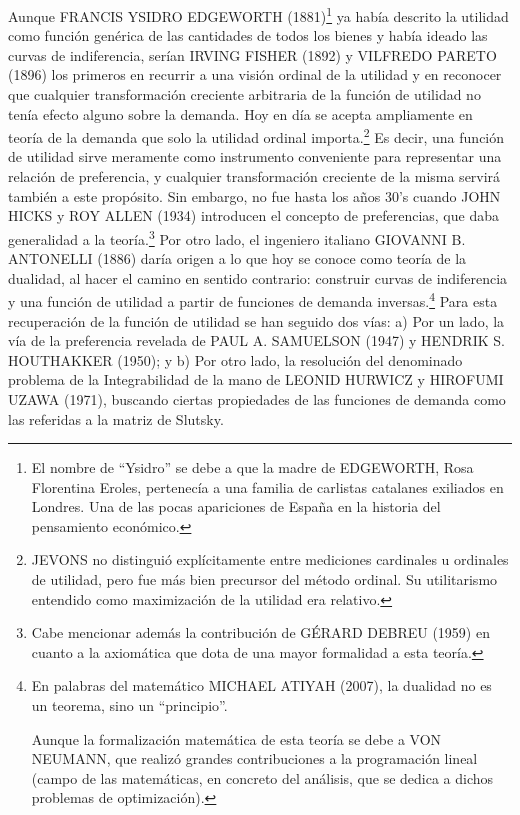 \documentclass[10pt,a4paper]{article}
\begin{document}
Aunque FRANCIS YSIDRO EDGEWORTH (1881)\footnote{%
    El nombre de “Ysidro” se debe a que la madre de EDGEWORTH, Rosa Florentina Eroles, pertenecía a una familia de carlistas catalanes exiliados en Londres. Una de las pocas apariciones de España en la historia del pensamiento económico.
} ya había descrito la utilidad como función genérica de las cantidades de todos los bienes y había ideado las curvas de indiferencia, serían IRVING FISHER (1892) y VILFREDO PARETO (1896) los primeros en recurrir a una visión ordinal de la utilidad  y en reconocer que cualquier transformación creciente arbitraria de la función de utilidad no tenía efecto alguno sobre la demanda. Hoy en día se acepta ampliamente en teoría de la demanda que solo la utilidad ordinal importa.\footnote{%
    JEVONS no distinguió explícitamente entre mediciones cardinales u ordinales de utilidad, pero fue más bien precursor del método ordinal. Su utilitarismo entendido como maximización de la utilidad era relativo.
} Es decir, una función de utilidad sirve meramente como instrumento conveniente para representar una relación de preferencia, y cualquier transformación creciente de la misma servirá también a este propósito.
Sin embargo, no fue hasta los años 30’s cuando JOHN HICKS y ROY ALLEN (1934) introducen el concepto de preferencias, que daba generalidad a la teoría.\footnote{%
    Cabe mencionar además la contribución de GÉRARD DEBREU (1959) en cuanto a la axiomática que dota de una mayor formalidad a esta teoría.
}
Por otro lado, el ingeniero italiano GIOVANNI B. ANTONELLI (1886) daría origen a lo que hoy se conoce como teoría de la dualidad, al hacer el camino en sentido contrario: construir curvas de indiferencia y una función de utilidad a partir de funciones de demanda inversas.\footnote{%
    En palabras del matemático MICHAEL ATIYAH (2007), la dualidad no es un teorema, sino un “principio”.

Aunque la formalización matemática de esta teoría se debe a VON NEUMANN, que realizó grandes contribuciones a la programación lineal (campo de las matemáticas, en concreto del análisis, que se dedica a dichos problemas de optimización).
} Para esta recuperación de la función de utilidad se han seguido dos vías:
a)	Por un lado, la vía de la preferencia revelada de PAUL A. SAMUELSON (1947) y HENDRIK S. HOUTHAKKER (1950); y
b)	Por otro lado, la resolución del denominado problema de la Integrabilidad de la mano de LEONID HURWICZ y HIROFUMI UZAWA (1971), buscando ciertas propiedades de las funciones de demanda como las referidas a la matriz de Slutsky.
\end{document}

